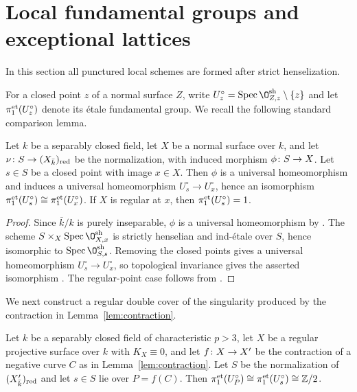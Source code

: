 \section{Local fundamental groups and exceptional lattices}\label{sec:local}
In this section all punctured local schemes are formed after strict henselization.

For a closed point $z$ of a normal surface $Z$, write $U_z^\circ = \Spec\O^{\rm sh}_{Z,z}\setminus\{z\}$ and let $\pi_1^{\rm et}(U_z^\circ)$ denote its \'etale fundamental group.
We recall the following standard comparison lemma.

\begin{lemma}\label{lem:transport}
Let $k$ be a separably closed field, let $X$ be a normal surface over $k$, and let $\nu\colon S\to (X_{\bar k})_{\rm red}$ be the normalization, with induced morphism $\phi\colon S\to X$.
Let $s\in S$ be a closed point with image $x\in X$.
Then $\phi$ is a universal homeomorphism and induces a universal homeomorphism $U_s^\circ\to U_x^\circ$, hence an isomorphism $\pi_1^{\rm et}(U_s^\circ)\cong\pi_1^{\rm et}(U_x^\circ)$.
If $X$ is regular at $x$, then $\pi_1^{\rm et}(U_s^\circ) = 1$.
\end{lemma}

\begin{proof}
Since $\bar k/k$ is purely inseparable, $\phi$ is a universal homeomorphism by \cite[Lemma~2.2(2)]{Tan18BC}.
The scheme $S\times_X\Spec\O^{\rm sh}_{X,x}$ is strictly henselian and ind-\'etale over $S$, hence isomorphic to $\Spec\O^{\rm sh}_{S,s}$.
Removing the closed points gives a universal homeomorphism $U_s^\circ\to U_x^\circ$, so topological invariance gives the asserted isomorphism \cite[Tag~]{Stacks}.
The regular-point case follows from \cite[Corollary~2.4]{Sch08}.
\end{proof}

We next construct a regular double cover of the singularity produced by the contraction in Lemma~\ref{lem:contraction}.

\begin{lemma}\label{lem:A1-cover}
Let $k$ be a separably closed field of characteristic $p>3$, let $X$ be a regular projective surface over $k$ with $K_X\equiv 0$, and let $f\colon X\to X'$ be the contraction of a negative curve $C$ as in Lemma~\ref{lem:contraction}.
Let $S$ be the normalization of $(X'_{\bar k})_{\rm red}$ and let $s\in S$ lie over $P = f(C)$.
Then $\pi_1^{\rm et}(U_P^\circ)\cong\pi_1^{\rm et}(U_s^\circ)\cong\mathbb{Z}/2$.
\end{lemma}

